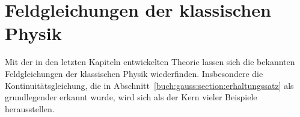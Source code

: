 %
%
%
\chapter{Feldgleichungen der klassischen Physik
\label{chapter:feldgleichungen}}

\noindent
Mit der in den letzten Kapiteln entwickelten Theorie lassen sich
die bekannten Feldgleichungen der klassischen Physik wiederfinden.
Insbesondere die Kontinuitätsgleichung, die in
Abschnitt~\ref{buch:gauss:section:erhaltungssatz}
als grundlegender erkannt wurde,
wird sich als der Kern vieler Beispiele herausstellen.






